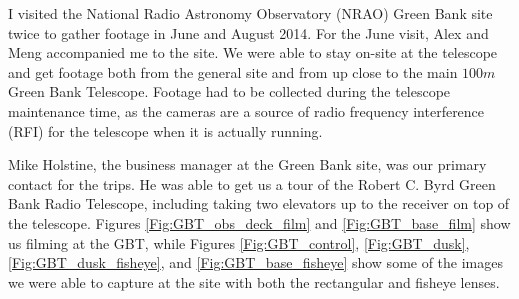 I visited the National Radio Astronomy Observatory (NRAO) Green Bank site twice to gather footage in June and August 2014. For the June visit, Alex and Meng accompanied me to the site. We were able to stay on-site at the telescope and get footage both from the general site and from up close to the main $100 m$ Green Bank Telescope. Footage had to be collected during the telescope maintenance time, as the cameras are a source of radio frequency interference (RFI) for the telescope when it is actually running.

Mike Holstine, the business manager at the Green Bank site, was our primary contact for the trips. He was able to get us a tour of the Robert C. Byrd Green Bank Radio Telescope, including taking two elevators up to the receiver on top of the telescope. Figures \ref{Fig:GBT_obs_deck_film} and \ref{Fig:GBT_base_film} show us filming at the GBT, while Figures \ref{Fig:GBT_control}, \ref{Fig:GBT_dusk}, \ref{Fig:GBT_dusk_fisheye}, and \ref{Fig:GBT_base_fisheye} show some of the images we were able to capture at the site with both the rectangular and fisheye lenses. 

